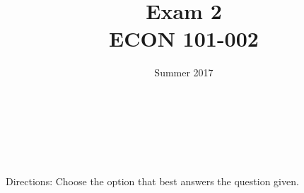 \documentclass[addpoints,11pt]{exam}
\theoremstyle{definition}
\newcommand{\dd}[1]{}
\begin{document}
\title{\textbf{Exam 2} \dd{Solutions} \\ \vspace{2 mm} {\large ECON 101-002}}
\author{Summer 2017}
\date{}
\maketitle

\\

\\

\\

\\

Directions: Choose the option that best answers the question given.
\end{document}
